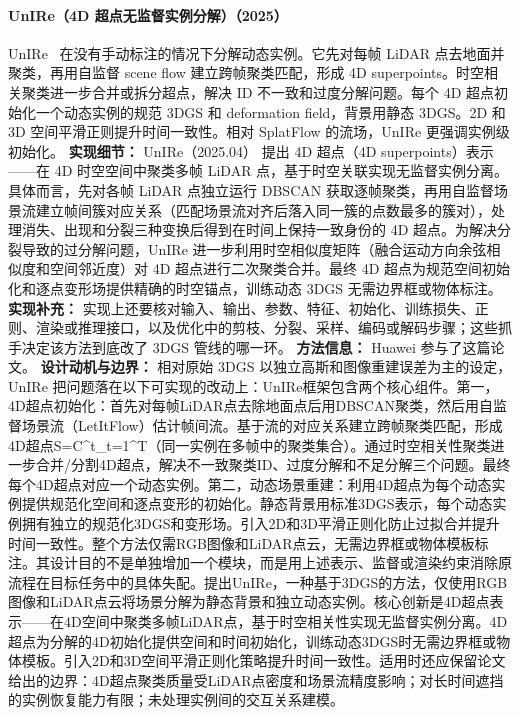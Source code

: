 \paragraph{UnIRe（4D 超点无监督实例分解）（2025）}
UnIRe~\cite{2504_00763} 在没有手动标注的情况下分解动态实例。它先对每帧 LiDAR 点去地面并聚类，再用自监督 scene flow 建立跨帧聚类匹配，形成 4D superpoints。时空相关聚类进一步合并或拆分超点，解决 ID 不一致和过度分解问题。每个 4D 超点初始化一个动态实例的规范 3DGS 和 deformation field，背景用静态 3DGS。2D 和 3D 空间平滑正则提升时间一致性。相对 SplatFlow 的流场，UnIRe 更强调实例级初始化。
\textbf{实现细节：} UnIRe（2025.04） 提出 4D 超点（4D superpoints）表示——在 4D 时空空间中聚类多帧 LiDAR 点，基于时空关联实现无监督实例分离。具体而言，先对各帧 LiDAR 点独立运行 DBSCAN 获取逐帧聚类，再用自监督场景流建立帧间簇对应关系（匹配场景流对齐后落入同一簇的点数最多的簇对），处理消失、出现和分裂三种变换后得到在时间上保持一致身份的 4D 超点。为解决分裂导致的过分解问题，UnIRe 进一步利用时空相似度矩阵（融合运动方向余弦相似度和空间邻近度）对 4D 超点进行二次聚类合并。最终 4D 超点为规范空间初始化和逐点变形场提供精确的时空锚点，训练动态 3DGS 无需边界框或物体标注。
\textbf{实现补充：} 实现上还要核对输入、输出、参数、特征、初始化、训练损失、正则、渲染或推理接口，以及优化中的剪枝、分裂、采样、编码或解码步骤；这些抓手决定该方法到底改了 3DGS 管线的哪一环。
\textbf{方法信息：} Huawei 参与了这篇论文。
\textbf{设计动机与边界：} 相对原始 3DGS 以独立高斯和图像重建误差为主的设定，UnIRe 把问题落在以下可实现的改动上：UnIRe框架包含两个核心组件。第一，4D超点初始化：首先对每帧LiDAR点去除地面点后用DBSCAN聚类，然后用自监督场景流（LetItFlow）估计帧间流。基于流的对应关系建立跨帧聚类匹配，形成4D超点S={C\^{}t}\_{t=1}\^{}T（同一实例在多帧中的聚类集合）。通过时空相关性聚类进一步合并/分割4D超点，解决不一致聚类ID、过度分解和不足分解三个问题。最终每个4D超点对应一个动态实例。第二，动态场景重建：利用4D超点为每个动态实例提供规范化空间和逐点变形的初始化。静态背景用标准3DGS表示，每个动态实例拥有独立的规范化3DGS和变形场。引入2D和3D平滑正则化防止过拟合并提升时间一致性。整个方法仅需RGB图像和LiDAR点云，无需边界框或物体模板标注。其设计目的不是单独增加一个模块，而是用上述表示、监督或渲染约束消除原流程在目标任务中的具体失配。提出UnIRe，一种基于3DGS的方法，仅使用RGB图像和LiDAR点云将场景分解为静态背景和独立动态实例。核心创新是4D超点表示——在4D空间中聚类多帧LiDAR点，基于时空相关性实现无监督实例分离。4D超点为分解的4D初始化提供空间和时间初始化，训练动态3DGS时无需边界框或物体模板。引入2D和3D空间平滑正则化策略提升时间一致性。适用时还应保留论文给出的边界：4D超点聚类质量受LiDAR点密度和场景流精度影响；对长时间遮挡的实例恢复能力有限；未处理实例间的交互关系建模。
